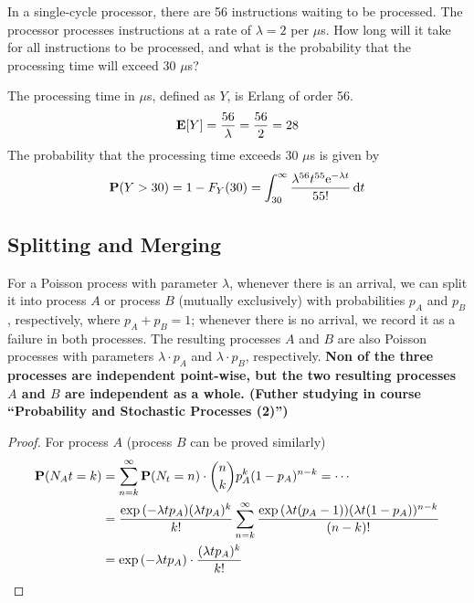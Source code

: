\begin{example}
    In a single-cycle processor, there are 56 instructions waiting to be processed. The processor processes instructions at a rate of $\lambda = 2$ per $\mu$s. How long will it take for all instructions to be processed, and what is the probability that the processing time will exceed 30 $\mu$s?
\end{example}
\begin{solution}
    The processing time in $\mu$s, defined as $Y$, is Erlang of order 56.
    \begin{equation}
        \mathbf{E}[Y] = \frac{56}{\lambda} = \frac{56}{2} = 28
    \end{equation}
    The probability that the processing time exceeds 30 $\mu$s is given by
    \begin{equation}
        \mathbf{P}(Y > 30) = 1 - F_Y(30) = \int_{30}^{\infty} \frac{\lambda^{56} t^{55} \mathrm{e}^{-\lambda t}}{55!} \dd{t}
    \end{equation}
\end{solution}

\subsection{Splitting and Merging}
For a Poisson process with parameter $\lambda$, whenever there is an arrival, we can split it into process $A$ or process $B$ (mutually exclusively) with probabilities $p_A$ and $p_B$, respectively, where $p_A + p_B = 1$; whenever there is no arrival, we record it as a failure in both processes. The resulting processes $A$ and $B$ are also Poisson processes with parameters $\lambda \cdot p_A$ and $\lambda \cdot p_B$, respectively. \textbf{Non of the three processes are independent point-wise, but the two resulting processes $A$ and $B$ are independent as a whole. (Futher studying in course ``Probability and Stochastic Processes (2)'')}
\begin{proof}
    For process $A$ (process $B$ can be proved similarly)
    \begin{equation}
    \begin{aligned}
        \mathbf{P}(N_At = k) &= \sum_{n=k}^{\infty} \mathbf{P}(N_t = n) \cdot \binom{n}{k} p_A^k (1-p_A)^{n-k} = \cdots \\ 
        &= \frac{\exp\qty(-\lambda t p_A)(\lambda t p_A)^k}{k!} \sum_{n=k}^{\infty} \frac{\exp\qty(\lambda t(p_A-1)) (\lambda t(1-p_A))^{n-k}}{(n-k)!} \\ 
        &= \exp\qty(-\lambda t p_A) \cdot \frac{(\lambda t p_A)^k}{k!}
    \end{aligned}
    \end{equation}
\end{proof}

